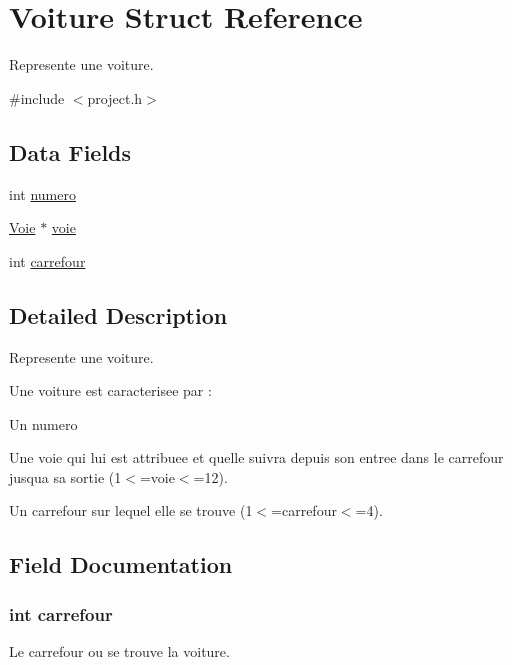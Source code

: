 \hypertarget{struct_voiture}{}\section{Voiture Struct Reference}
\label{struct_voiture}


Represente une voiture.  




{\ttfamily \#include $<$project.\+h$>$}

\subsection*{Data Fields}
\begin{DoxyCompactItemize}
\item 
int \hyperlink{struct_voiture_a2c30f43104974e72e2809fb4569804b0}{numero}
\item 
\hyperlink{struct_voie}{Voie} $\ast$ \hyperlink{struct_voiture_acce856164d15fb4096637b544821166d}{voie}
\item 
int \hyperlink{struct_voiture_a49c1ca0385a5b276704a97cdceef2d83}{carrefour}
\end{DoxyCompactItemize}


\subsection{Detailed Description}
Represente une voiture. 

Une voiture est caracterisee par \+:
\begin{DoxyItemize}
\item Un numero
\item Une voie qui lui est attribuee et qu\textquotesingle{}elle suivra depuis son entree dans le carrefour jusqu\textquotesingle{}a sa sortie (1$<$=voie$<$=12).
\item Un carrefour sur lequel elle se trouve (1$<$=carrefour$<$=4). 
\end{DoxyItemize}

\subsection{Field Documentation}
\hypertarget{struct_voiture_a49c1ca0385a5b276704a97cdceef2d83}{}
\subsubsection[{carrefour}]{\setlength{\rightskip}{0pt plus 5cm}int carrefour}\label{struct_voiture_a49c1ca0385a5b276704a97cdceef2d83}
Le carrefour ou se trouve la voiture. \hypertarget{struct_voiture_a2c30f43104974e72e2809fb4569804b0}{}
